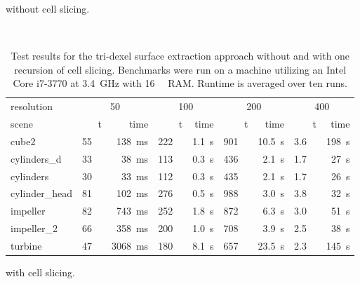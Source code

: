 \begin{table}
\begin{subtable}{\textwidth}
		\caption{
			without cell slicing.
		}
		\label{tbl:tri_dexel_results_no_slicing}
	\end{subtable}
	\bigskip\\
	\begin{subtable}{\textwidth}
		\centering
		\begin{tabular}{l|rr|rr|rr|rr}
			resolution     & \multicolumn{2}{c}{50} & \multicolumn{2}{c}{100} & \multicolumn{2}{c}{200} & \multicolumn{2}{c}{400} \\
			scene          & t\sub{out} & time & t\sub{out} & time & t\sub{out} & time & t\sub{out} & time \\
			\midrule
			cube2          & \SI{55}{\kilo\nothing} & \SI{ 138}{\milli\second} & \SI{222}{\kilo\nothing} & \SI{1.1}{\second} & \SI{901}{\kilo\nothing} & \SI{10.5}{\second} & \SI{3.6}{\mega\nothing} & \SI{198}{\second} \\
			cylinders\_d   & \SI{33}{\kilo\nothing} & \SI{  38}{\milli\second} & \SI{113}{\kilo\nothing} & \SI{0.3}{\second} & \SI{436}{\kilo\nothing} & \SI{ 2.1}{\second} & \SI{1.7}{\mega\nothing} & \SI{ 27}{\second} \\
			cylinders      & \SI{30}{\kilo\nothing} & \SI{  33}{\milli\second} & \SI{112}{\kilo\nothing} & \SI{0.3}{\second} & \SI{435}{\kilo\nothing} & \SI{ 2.1}{\second} & \SI{1.7}{\mega\nothing} & \SI{ 26}{\second} \\
			cylinder\_head & \SI{81}{\kilo\nothing} & \SI{ 102}{\milli\second} & \SI{276}{\kilo\nothing} & \SI{0.5}{\second} & \SI{988}{\kilo\nothing} & \SI{ 3.0}{\second} & \SI{3.8}{\mega\nothing} & \SI{ 32}{\second} \\
			impeller       & \SI{82}{\kilo\nothing} & \SI{ 743}{\milli\second} & \SI{252}{\kilo\nothing} & \SI{1.8}{\second} & \SI{872}{\kilo\nothing} & \SI{ 6.3}{\second} & \SI{3.0}{\mega\nothing} & \SI{ 51}{\second} \\
			impeller\_2    & \SI{66}{\kilo\nothing} & \SI{ 358}{\milli\second} & \SI{200}{\kilo\nothing} & \SI{1.0}{\second} & \SI{708}{\kilo\nothing} & \SI{ 3.9}{\second} & \SI{2.5}{\mega\nothing} & \SI{ 38}{\second} \\
			turbine        & \SI{47}{\kilo\nothing} & \SI{3068}{\milli\second} & \SI{180}{\kilo\nothing} & \SI{8.1}{\second} & \SI{657}{\kilo\nothing} & \SI{23.5}{\second} & \SI{2.3}{\mega\nothing} & \SI{145}{\second} \\
		\end{tabular}
		\caption{
			with cell slicing.
		}
		\label{tbl:tri_dexel_results_slicing}
	\end{subtable}
	\caption{
		Test results for the tri-dexel surface extraction approach without and with one recursion of cell slicing.
		Benchmarks were run on a machine utilizing an Intel Core i7-3770 at \SI{3.4}{\giga\hertz} with \SI{16}{\gibi\byte} RAM.
		Runtime is averaged over ten runs.
	}
	\label{tbl:tri_dexel_results}
\end{table}
